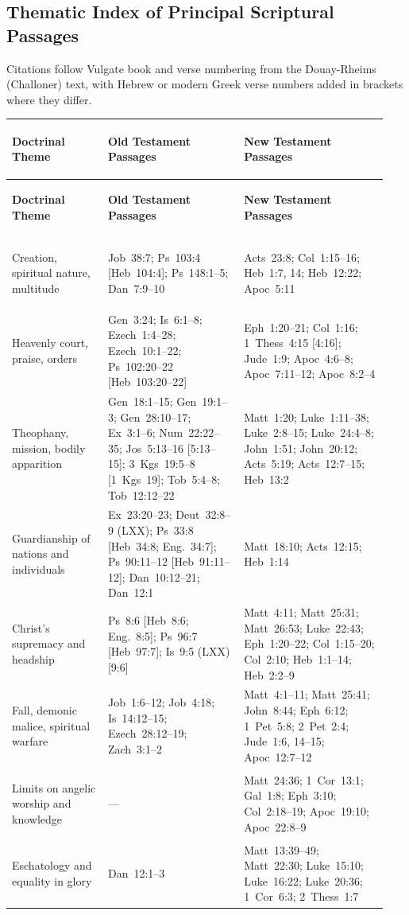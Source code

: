 \subsection{Thematic Index of Principal Scriptural Passages}

Citations follow Vulgate book and verse numbering from the Douay-Rheims (Challoner) text, with Hebrew or modern Greek verse numbers added in brackets where they differ.

{\footnotesize
\setlength{\tabcolsep}{2.5pt}
\renewcommand{\arraystretch}{1.15}
\begin{longtable}{>{\bfseries\raggedright\arraybackslash}p{0.24\linewidth}>{\raggedright\arraybackslash}p{0.34\linewidth}>{\raggedright\arraybackslash}p{0.36\linewidth}}
\toprule
\textbf{Doctrinal Theme} & \textbf{Old Testament Passages} & \textbf{New Testament Passages} \\
\midrule
\endfirsthead
\toprule
\textbf{Doctrinal Theme} & \textbf{Old Testament Passages} & \textbf{New Testament Passages} \\
\midrule
\endhead
\bottomrule
\endfoot
Creation, spiritual nature, multitude & Job~38:7; Ps~103:4 [Heb~104:4]; Ps~148:1--5; Dan~7:9--10 & Acts~23:8; Col~1:15--16; Heb~1:7, 14; Heb~12:22; Apoc~5:11 \\
\addlinespace[2pt]
Heavenly court, praise, orders & Gen~3:24; Is~6:1--8; Ezech~1:4--28; Ezech~10:1--22; Ps~102:20--22 [Heb~103:20--22] & Eph~1:20--21; Col~1:16; 1~Thess~4:15 [4:16]; Jude~1:9; Apoc~4:6--8; Apoc~7:11--12; Apoc~8:2--4 \\
\addlinespace[2pt]
Theophany, mission, bodily apparition & Gen~18:1--15; Gen~19:1--3; Gen~28:10--17; Ex~3:1--6; Num~22:22--35; Jos~5:13--16 [5:13--15]; 3~Kgs~19:5--8 [1~Kgs~19]; Tob~5:4--8; Tob~12:12--22 & Matt~1:20; Luke~1:11--38; Luke~2:8--15; Luke~24:4--8; John~1:51; John~20:12; Acts~5:19; Acts~12:7--15; Heb~13:2 \\
\addlinespace[2pt]
Guardianship of nations and individuals & Ex~23:20--23; Deut~32:8--9 (LXX); Ps~33:8 [Heb~34:8; Eng.~34:7]; Ps~90:11--12 [Heb~91:11--12]; Dan~10:12--21; Dan~12:1 & Matt~18:10; Acts~12:15; Heb~1:14 \\
\addlinespace[2pt]
Christ's supremacy and headship & Ps~8:6 [Heb~8:6; Eng.~8:5]; Ps~96:7 [Heb~97:7]; Is~9:5 (LXX) [9:6] & Matt~4:11; Matt~25:31; Matt~26:53; Luke~22:43; Eph~1:20--22; Col~1:15--20; Col~2:10; Heb~1:1--14; Heb~2:2--9 \\
\addlinespace[2pt]
Fall, demonic malice, spiritual warfare & Job~1:6--12; Job~4:18; Is~14:12--15; Ezech~28:12--19; Zach~3:1--2 & Matt~4:1--11; Matt~25:41; John~8:44; Eph~6:12; 1~Pet~5:8; 2~Pet~2:4; Jude~1:6, 14--15; Apoc~12:7--12 \\
\addlinespace[2pt]
Limits on angelic worship and knowledge & --- & Matt~24:36; 1~Cor~13:1; Gal~1:8; Eph~3:10; Col~2:18--19; Apoc~19:10; Apoc~22:8--9 \\
\addlinespace[2pt]
Eschatology and equality in glory & Dan~12:1--3 & Matt~13:39--49; Matt~22:30; Luke~15:10; Luke~16:22; Luke~20:36; 1~Cor~6:3; 2~Thess~1:7 \\
\end{longtable}
}

